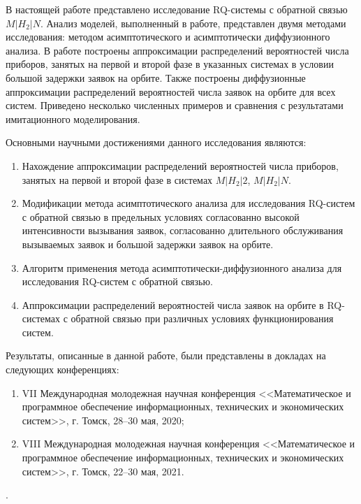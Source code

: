 В настоящей работе представлено исследование RQ-системы с обратной связью $M|H_{2}|N$. Анализ моделей, выполненный в работе, представлен двумя методами исследования: методом асимптотического и асимптотически диффузионного анализа. В работе построены аппроксимации распределений вероятностей числа приборов, занятых на первой и второй фазе в указанных системах в условии большой задержки заявок на орбите. Также построены диффузионные аппроксимации распределений вероятностей числа заявок на орбите для всех систем. Приведено несколько численных примеров и сравнения с результатами имитационного моделирования. 

Основными научными достижениями данного исследования являются:
\begin{enumerate} 
	\item Нахождение аппроксимации распределений вероятностей числа приборов, занятых на первой и второй фазе в системах $M|H_{2}|2$, $M|H_{2}|N$. 
	\item Модификации метода асимптотического анализа для исследования RQ-систем с обратной связью в предельных условиях согласованно высокой интенсивности вызывания заявок, согласованно длительного обслуживания вызываемых заявок и большой задержки заявок на орбите.
	\item Алгоритм применения метода асимптотически-диффузионного анализа для исследования RQ-систем с обратной связью.
	\item Аппроксимации распределений вероятностей числа заявок на орбите в RQ-системах с обратной связью при различных условиях функционирования систем.
\end{enumerate}

Результаты, описанные в данной работе, были представлены в докладах на следующих конференциях:
\begin{enumerate} 
	\item VII Международная молодежная научная конференция <<Математическое и программное обеспечение информационных, технических и экономических систем>>, г. Томск, 28--30 мая, 2020;
	\item VIII Международная молодежная научная конференция <<Математическое и программное обеспечение информационных, технических и экономических систем>>, г. Томск, 22--30 мая, 2021.
\end{enumerate}.
